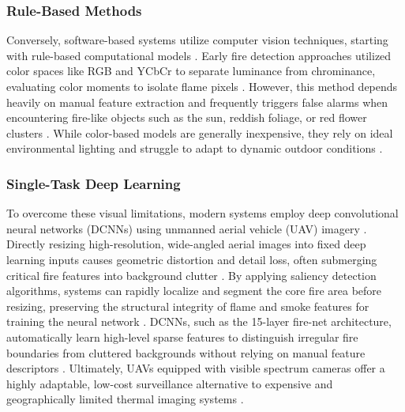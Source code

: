 \documentclass[sigconf]{acmart}
\begin{document}
\subsubsection{Rule-Based Methods}
Conversely, software-based systems utilize computer vision techniques, starting with rule-based computational models \cite{celik}. Early fire detection approaches utilized color spaces like RGB and YCbCr to separate luminance from chrominance, evaluating color moments to isolate flame pixels \cite{celik}. However, this method depends heavily on manual feature extraction and frequently triggers false alarms when encountering fire-like objects such as the sun, reddish foliage, or red flower clusters \cite{celik}. While color-based models are generally inexpensive, they rely on ideal environmental lighting and struggle to adapt to dynamic outdoor conditions \cite{celik}.

\subsubsection{Single-Task Deep Learning}
To overcome these visual limitations, modern systems employ deep convolutional neural networks (DCNNs) using unmanned aerial vehicle (UAV) imagery \cite{zhao}. Directly resizing high-resolution, wide-angled aerial images into fixed deep learning inputs causes geometric distortion and detail loss, often submerging critical fire features into background clutter \cite{zhao}. By applying saliency detection algorithms, systems can rapidly localize and segment the core fire area before resizing, preserving the structural integrity of flame and smoke features for training the neural network \cite{zhao}. DCNNs, such as the 15-layer fire-net architecture, automatically learn high-level sparse features to distinguish irregular fire boundaries from cluttered backgrounds without relying on manual feature descriptors \cite{zhao}. Ultimately, UAVs equipped with visible spectrum cameras offer a highly adaptable, low-cost surveillance alternative to expensive and geographically limited thermal imaging systems \cite{zhao}.
\end{document}
